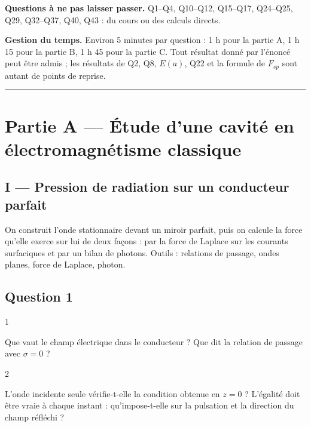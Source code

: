 \documentclass[11pt,a4paper]{article}
\begin{document}
\textbf{Questions à ne pas laisser passer.} Q1--Q4, Q10--Q12, Q15--Q17, Q24--Q25, Q29, Q32--Q37, Q40, Q43 : du cours ou des calculs directs.

\textbf{Gestion du temps.} Environ 5 minutes par question : 1 h pour la partie A, 1 h 15 pour la partie B, 1 h 45 pour la partie C. Tout résultat donné par l'énoncé peut être admis ; les résultats de Q2, Q8, \(E(a)\), Q22 et la formule de \(F_{sp}\) sont autant de points de reprise.

\begin{center}\rule{0.5\linewidth}{0.5pt}\end{center}

\hypertarget{partie-a-uxe9tude-dune-cavituxe9-en-uxe9lectromagnuxe9tisme-classique}{%
\section{Partie A --- Étude d'une cavité en électromagnétisme classique}\label{partie-a-uxe9tude-dune-cavituxe9-en-uxe9lectromagnuxe9tisme-classique}}

\hypertarget{i-pression-de-radiation-sur-un-conducteur-parfait}{%
\subsection{I --- Pression de radiation sur un conducteur parfait}\label{i-pression-de-radiation-sur-un-conducteur-parfait}}

On construit l'onde stationnaire devant un miroir parfait, puis on calcule la force qu'elle exerce sur lui de deux façons : par la force de Laplace sur les courants surfaciques et par un bilan de photons. Outils : relations de passage, ondes planes, force de Laplace, photon.

\hypertarget{question-1}{%
\subsection{Question 1}\label{question-1}}

\begin{indication}{1}

Que vaut le champ électrique dans le conducteur ? Que dit la relation de passage avec \(\sigma=0\) ?

\end{indication}

\begin{indication}{2}

L'onde incidente seule vérifie-t-elle la condition obtenue en \(z=0\) ? L'égalité doit être vraie à chaque instant : qu'impose-t-elle sur la pulsation et la direction du champ réfléchi ?

\end{indication}
\end{document}
